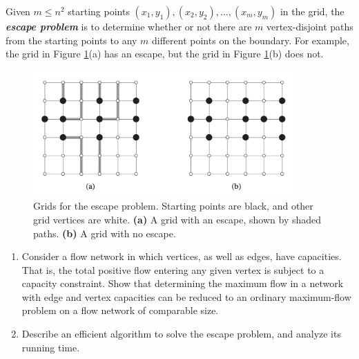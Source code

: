 \documentclass{../../class}
\begin{document}
Given $m \leq n^2$ starting points $(x_1, y_1), (x_2, y_2), \dots, (x_m, y_m)$ in the grid, the \textbf{\textit{escape problem}} is to determine whether or not there are $m$ vertex-disjoint paths from the starting points to any $m$ different points on the boundary. For example, the grid in Figure \ref{fig:1}(a) has an escape, but the grid in Figure \ref{fig:1}(b) does not.
\begin{figure}[H]
    \centering
    \includegraphics[width = 10cm]{img/1.png}
    \caption{Grids for the escape problem. Starting points are black, and other grid vertices are white. \textbf{(a)} A grid with an escape, shown by shaded paths. \textbf{(b)} A grid with no escape.}
    \label{fig:1}
\end{figure}
\begin{enumerate}
    \item Consider a flow network in which vertices, as well as edges, have capacities. That is, the total positive flow entering any given vertex is subject to a capacity constraint. Show that determining the maximum flow in a network with edge and vertex capacities can be reduced to an ordinary maximum-flow problem on a flow network of comparable size.
    \item Describe an efficient algorithm to solve the escape problem, and analyze its running time.
\end{enumerate}
\end{document}
